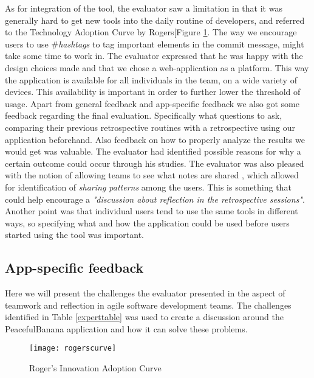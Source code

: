 As for integration of the tool, the evaluator saw a limitation in that it was generally hard to get new tools into the daily routine of developers\cite{rogers2010diffusion}, and referred to the Technology Adoption Curve by Rogers[Figure \ref{rogerscurve}. The way we encourage users to use \#\emph{hashtags} to tag important elements in the commit message, might take some time to work in. The evaluator expressed that he was happy with the design choices made and that we chose a web-application as a platform. This way the application is available for all individuals in the team, on a wide variety of devices. This availability is important in order to further lower the threshold of usage. Apart from general feedback and app-specific feedback we also got some feedback regarding the final evaluation. Specifically what questions to ask, comparing their previous retrospective routines with a retrospective using our application beforehand. Also feedback on how to properly analyze the results we would get was valuable. The evaluator had identified possible reasons for why a certain outcome could occur through his studies. The evaluator was also pleased with the notion of allowing teams to see what notes are shared , which allowed for identification of \emph{sharing patterns} among the users. This is something that could help encourage a \emph{"discussion about reflection in the retrospective sessions"}. Another point was that individual users tend to use the same tools in different ways, so specifying what and how the application could be used before users started using the tool was important.  
\subsection{App-specific feedback}
Here we will present the challenges the evaluator presented in the aspect of teamwork and reflection in agile software development teams. The challenges identified in Table \ref{experttable} was used to create a discussion around the PeacefulBanana application and how it can solve these problems. 
\begin{figure}[H]
    \centering
        \texttt{[image: rogerscurve]}
    \caption{Roger's Innovation Adoption Curve}
    \label{rogerscurve}
\end{figure}

\newpage

